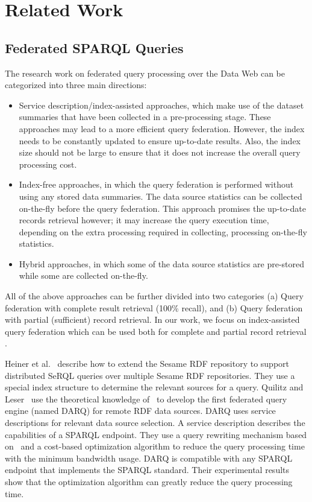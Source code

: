 \documentclass{sig-alternate}  %
\begin{document}
\section{Related Work}
\subsection{Federated SPARQL Queries}
The research work on federated query processing over the Data Web
can be categorized into three main directions: 
\begin{itemize}
\item Service description/index-assisted approaches, which make use of the dataset summaries that have been collected in a pre-processing stage. These approaches may lead to a more efficient query federation. However,
the index needs to be constantly updated to ensure up-to-date results.
Also, the index size should not be large to ensure that it does not
increase the overall query processing cost. 
\item Index-free approaches, in which the query federation is performed
without using any stored data summaries. The data source statistics can be collected on-the-fly before the query federation. This approach promises the up-to-date records retrieval however; it may increase the query execution time, depending on the extra processing required in collecting, processing on-the-fly statistics.
\item Hybrid approaches, in which some of the data source statistics are pre-stored while some are collected on-the-fly. 
\end{itemize}

All of the above approaches can be further divided into two categories
(a) Query federation with complete result retrieval (100\% recall), and (b) Query federation
with partial (sufficient) record retrieval. In our work, we focus
on index-assisted query federation which can be used both for complete and partial record retrieval .

Heiner et al.~\cite{key-1} describe how to extend the Sesame RDF
repository to support distributed SeRQL queries over multiple Sesame
RDF repositories. They use a special index structure to determine
the relevant sources for a query. Quilitz and Leser~\cite{key-2}
use the theoretical knowledge of~\cite{key-1} to develop the first federated
query engine (named DARQ) for remote RDF data sources. DARQ uses service
descriptions for relevant data source selection. A service description
describes the capabilities of a SPARQL endpoint. They use a query rewriting
mechanism based on~\cite{key-8} and a cost-based optimization algorithm
to reduce the query processing time with the minimum bandwidth usage.
DARQ is compatible with any SPARQL endpoint that implements the SPARQL
standard. Their experimental results show that the optimization algorithm
can greatly reduce the query processing time.
\end{document}
